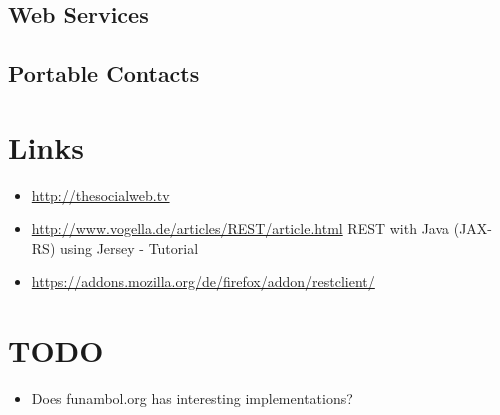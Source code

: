 \documentclass[12pt,a4paper]{scrartcl}		%
\begin{document}
\subsection{Web Services}

\subsection{Portable Contacts}

\section{Links}

\begin{itemize}
\item \url{http://thesocialweb.tv}
\item \url{http://www.vogella.de/articles/REST/article.html} REST with Java (JAX-RS) using Jersey - Tutorial
\item \url{https://addons.mozilla.org/de/firefox/addon/restclient/}

\end{itemize}

\section{TODO}
\begin{itemize}
\item Does funambol.org has interesting implementations?
\end{itemize}

{}

\end{document}
